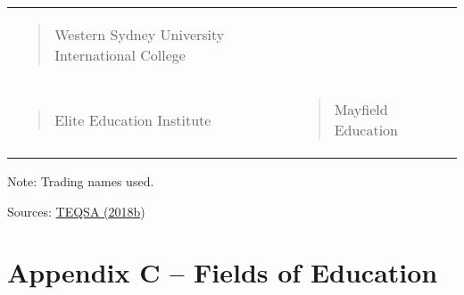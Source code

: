 \documentclass[]{book}
\begin{document}
\begin{longtable}[]{@{}lll@{}}
\begin{minipage}[t]{0.32\columnwidth}
\begin{quote}
Western Sydney University International College
\end{quote}\strut
\end{minipage}\tabularnewline
\begin{minipage}[t]{0.32\columnwidth}\raggedright
\begin{quote}
Elite Education Institute
\end{quote}\strut
\end{minipage} & \begin{minipage}[t]{0.32\columnwidth}\raggedright
\begin{quote}
Mayfield Education
\end{quote}\strut
\end{minipage} & \begin{minipage}[t]{0.32\columnwidth}\raggedright
\strut
\end{minipage}\tabularnewline
\bottomrule
\end{longtable}

Note: Trading names used.

Sources: \protect\hyperlink{_ENREF_199}{TEQSA (2018b})

\hypertarget{appendix-c-fields-of-education}{%
\chapter{Appendix C -- Fields of Education}\label{appendix-c-fields-of-education}}
\end{document}
